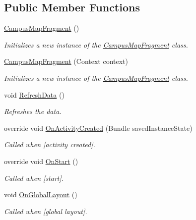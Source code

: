 \subsection*{Public Member Functions}
\begin{DoxyCompactItemize}
\item 
\hyperlink{class_w_c_c_mobile_1_1_campus_map_fragment_ad3136fc51f47c525e00231b068431d1c}{Campus\+Map\+Fragment} ()
\begin{DoxyCompactList}\small\item\em Initializes a new instance of the \hyperlink{class_w_c_c_mobile_1_1_campus_map_fragment}{Campus\+Map\+Fragment} class. \end{DoxyCompactList}\item 
\hyperlink{class_w_c_c_mobile_1_1_campus_map_fragment_a25a52daf978a6b8e21feb51b5fbcc98c}{Campus\+Map\+Fragment} (Context context)
\begin{DoxyCompactList}\small\item\em Initializes a new instance of the \hyperlink{class_w_c_c_mobile_1_1_campus_map_fragment}{Campus\+Map\+Fragment} class. \end{DoxyCompactList}\item 
void \hyperlink{class_w_c_c_mobile_1_1_campus_map_fragment_aea93c17966750a5a7e29f7add0b29182}{Refresh\+Data} ()
\begin{DoxyCompactList}\small\item\em Refreshes the data. \end{DoxyCompactList}\item 
override void \hyperlink{class_w_c_c_mobile_1_1_campus_map_fragment_a623834901f10d1bb69af1668aa9a5e56}{On\+Activity\+Created} (Bundle saved\+Instance\+State)
\begin{DoxyCompactList}\small\item\em Called when \mbox{[}activity created\mbox{]}. \end{DoxyCompactList}\item 
override void \hyperlink{class_w_c_c_mobile_1_1_campus_map_fragment_ab8a6866347bd85d54a0c6a6fb2075ad3}{On\+Start} ()
\begin{DoxyCompactList}\small\item\em Called when \mbox{[}start\mbox{]}. \end{DoxyCompactList}\item 
void \hyperlink{class_w_c_c_mobile_1_1_campus_map_fragment_adf647c7d6ae94cdff17022cde53edbd9}{On\+Global\+Layout} ()
\begin{DoxyCompactList}\small\item\em Called when \mbox{[}global layout\mbox{]}. \end{DoxyCompactList}\item 

\end{DoxyCompactItemize}
